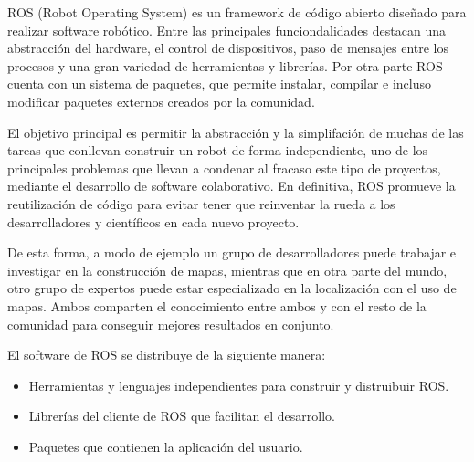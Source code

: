 


ROS (Robot Operating System) es un framework de código abierto diseñado para
realizar software robótico. Entre las principales funciondalidades destacan una
abstracción del hardware, el control de dispositivos, paso de mensajes entre los
procesos y una gran variedad de herramientas y librerías. Por otra parte ROS
cuenta con un sistema de paquetes, que permite instalar, compilar e incluso
modificar paquetes externos creados por la comunidad. 

El objetivo principal es permitir la abstracción y la simplifación de  muchas de
las tareas que conllevan construir un robot de forma independiente, uno de los
principales problemas que llevan a condenar al fracaso este tipo de proyectos,
mediante el desarrollo de software colaborativo. En definitiva, ROS promueve la
reutilización de código para evitar tener que reinventar la rueda a los
desarrolladores y científicos en cada nuevo proyecto.

De esta forma, a modo de ejemplo un grupo de desarrolladores puede trabajar e
investigar en la construcción de mapas, mientras que en otra parte del mundo,
otro grupo de expertos puede estar especializado en la localización con el uso
de mapas. Ambos comparten el conocimiento entre ambos y con el resto de la
comunidad para conseguir mejores resultados en conjunto.

El software de ROS se distribuye de la siguiente manera:

\begin{itemize}
  \item Herramientas y lenguajes independientes para construir y distruibuir
  ROS.
  \item Librerías del cliente de ROS que facilitan el desarrollo.
  \item Paquetes que contienen la aplicación del usuario.
\end{itemize}

